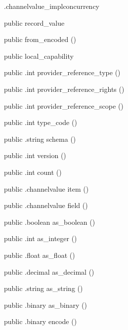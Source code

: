 \begin{CrexxClass}{.channelvalue\_impl}{concurrency}
\begin{Members}
    \Factory
      {public}
      {record\_value}
      {}

    \Factory
      {public}
      {from\_encoded}
      {()}

    \Factory
      {public}
      {local\_capability}
      {}

    \Method
      {public}
      {.int}
      {provider\_reference\_type}
      {()}

    \Method
      {public}
      {.int}
      {provider\_reference\_rights}
      {()}

    \Method
      {public}
      {.int}
      {provider\_reference\_scope}
      {()}

    \Method
      {public}
      {.int}
      {type\_code}
      {()}

    \Method
      {public}
      {.string}
      {schema}
      {()}

    \Method
      {public}
      {.int}
      {version}
      {()}

    \Method
      {public}
      {.int}
      {count}
      {()}

    \Method
      {public}
      {.channelvalue}
      {item}
      {()}

    \Method
      {public}
      {.channelvalue}
      {field}
      {()}

    \Method
      {public}
      {.boolean}
      {as\_boolean}
      {()}

    \Method
      {public}
      {.int}
      {as\_integer}
      {()}

    \Method
      {public}
      {.float}
      {as\_float}
      {()}

    \Method
      {public}
      {.decimal}
      {as\_decimal}
      {()}

    \Method
      {public}
      {.string}
      {as\_string}
      {()}

    \Method
      {public}
      {.binary}
      {as\_binary}
      {()}

    \Method
      {public}
      {.binary}
      {encode}
      {()}

  \end{Members}
\end{CrexxClass}

